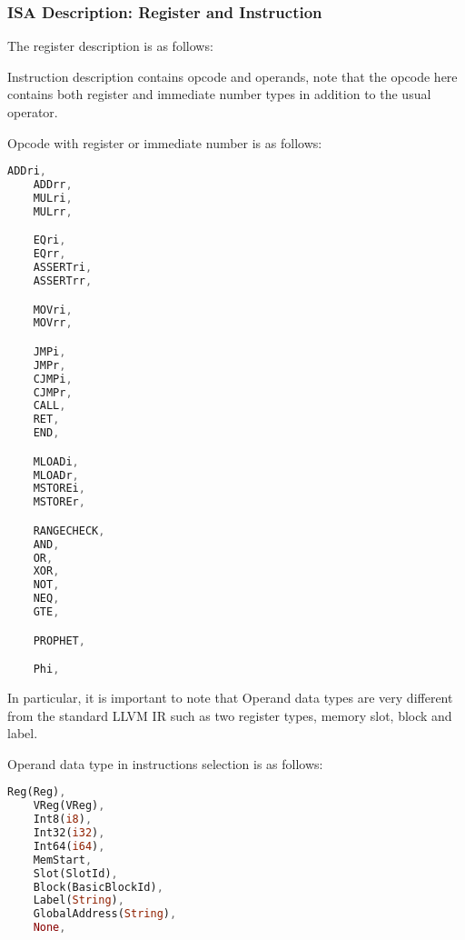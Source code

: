 \subsubsection{ISA Description: Register and Instruction}

The register description is as follows:
\begin{table}[!ht]
    \caption{Register Description}
    \label{table:register-description}
\end{table}

Instruction description contains opcode and operands,
note that the opcode here contains both register and immediate number types in addition to the usual operator.

Opcode with register or immediate number is as follows:
\begin{lstlisting}[language=rust]
    ADDri,
    ADDrr,
    MULri,
    MULrr,

    EQri,
    EQrr,
    ASSERTri,
    ASSERTrr,

    MOVri,
    MOVrr,

    JMPi,
    JMPr,
    CJMPi,
    CJMPr,
    CALL,
    RET,
    END,

    MLOADi,
    MLOADr,
    MSTOREi,
    MSTOREr,

    RANGECHECK,
    AND,
    OR,
    XOR,
    NOT,
    NEQ,
    GTE,

    PROPHET,

    Phi,
\end{lstlisting}

In particular, it is important to note that Operand data types are very different
from the standard LLVM IR such as two register types, memory slot, block and label.

Operand data type in instructions selection is as follows:
\begin{lstlisting}[language=rust]
    Reg(Reg),
    VReg(VReg),
    Int8(i8),
    Int32(i32),
    Int64(i64),
    MemStart,
    Slot(SlotId),
    Block(BasicBlockId),
    Label(String),
    GlobalAddress(String),
    None,
\end{lstlisting}